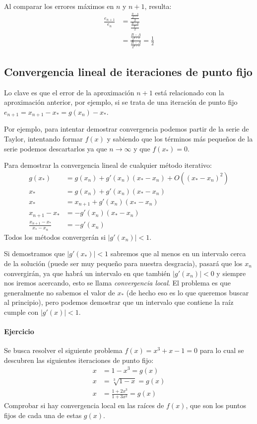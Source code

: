 \documentclass[spanish, fleqn]{article}
\begin{document}
Al comparar los errores máximos en $n$ y $n+1$, resulta:
\begin{align*}
\frac{e_{n+1}}{e_n} &= \frac{\frac{\frac{B-A}{2^{n+1}}}{2}}{\frac{\frac{B-A}{2^n}}{2}}
\\ &= \frac{\frac{B-A}{2^{n+2}}}{\frac{B-A}{2^{n+1}}}= \frac{1}{2}
\end{align*}

\subsection{Convergencia lineal de iteraciones de punto fijo}
Lo clave es que el error de la aproximación $n+1$ está relacionado con la aproximación anterior, por ejemplo, si se trata de una iteración de punto fijo $e_{n+1}= x_{n+1}-x_* = g(x_n)-x_*$.

Por ejemplo, para intentar demostrar convergencia podemos partir de la serie de Taylor, intentando formar $f(x)$ y sabiendo que los términos más pequeños de la serie podemos descartarlos ya que $n \rightarrow \infty$ y que $f(x_*)=0$.

Para demostrar la convergencia lineal de cualquier método iterativo:
\begin{align*}
g(x_*) &= g(x_n)+g'(x_n)(x_*-x_n)+O((x_*-x_n)^2)
\\ x_* &= g(x_n)+g'(x_n)(x_*-x_n)
\\ x_* &= x_{n+1}+g'(x_n)(x_*-x_n)
\\ x_{n+1}-x_* &= -g'(x_n)(x_*-x_n)
\\ \frac{x_{n+1}-x_*}{x_*-x_n} &= -g'(x_n)
\end{align*}
Todos los métodos convergerán si $|g'(x_n)|<1$.

Si demostramos que $|g'(x_*)|<1$ sabremos que al menos en un intervalo cerca de la solución (puede ser muy pequeño para nuestra desgracia), pasará que los $x_n$ convergirán, ya que habrá un intervalo en que también $|g'(x_n)|<0$ y siempre nos iremos acercando, esto se llama \emph{convergencia local}. El problema es que generalmente no sabemos el valor de $x_*$ (de hecho eso es lo que queremos buscar al principio), pero podemos demostrar que un intervalo que contiene la raíz cumple con $|g'(x)|<1$.

\paragraph{Ejercicio} Se busca resolver el siguiente problema $f(x)=x^3+x-1=0$ para lo cual se descubren las siguientes iteraciones de punto fijo:
\begin{align*}
x&= 1-x^3= g(x)
\\x&= \sqrt[3]{1-x}= g(x)
\\x&= \frac{1+2x^3}{1+3x^2}= g(x)
\end{align*}
Comprobar si hay convergencia local en las raíces de $f(x)$, que son los puntos fijos de cada una de estas $g(x)$.
\end{document}
